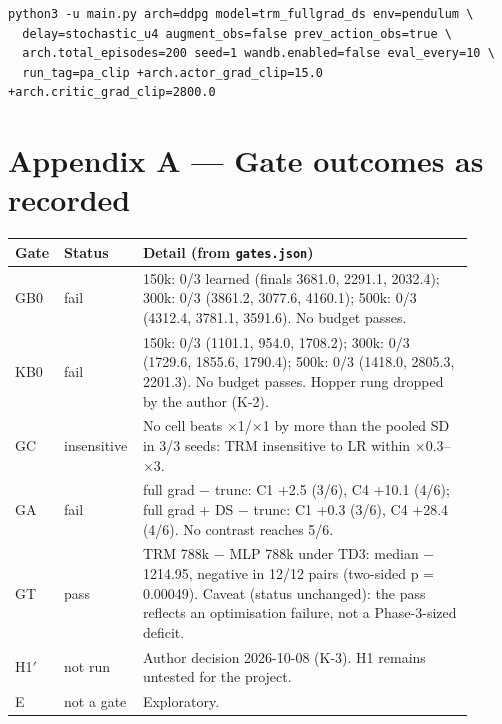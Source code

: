 \documentclass[11pt]{article}
\begin{document}
{\small\begin{verbatim}
python3 -u main.py arch=ddpg model=trm_fullgrad_ds env=pendulum \
  delay=stochastic_u4 augment_obs=false prev_action_obs=true \
  arch.total_episodes=200 seed=1 wandb.enabled=false eval_every=10 \
  run_tag=pa_clip +arch.actor_grad_clip=15.0 +arch.critic_grad_clip=2800.0
\end{verbatim}}



\section*{Appendix A --- Gate outcomes as recorded}



\begin{center}\small\begin{tabular}{>{\raggedright\arraybackslash}p{0.079\linewidth}>{\raggedright\arraybackslash}p{0.127\linewidth}>{\raggedright\arraybackslash}p{0.701\linewidth}}
\toprule
Gate & Status & Detail (from \texttt{gates.json}) \\
\midrule
GB0 & fail & 150k: 0/3 learned (finals 3681.0, 2291.1, 2032.4); 300k: 0/3 (3861.2, 3077.6, 4160.1); 500k: 0/3 (4312.4, 3781.1, 3591.6). No budget passes. \\
KB0 & fail & 150k: 0/3 (1101.1, 954.0, 1708.2); 300k: 0/3 (1729.6, 1855.6, 1790.4); 500k: 0/3 (1418.0, 2805.3, 2201.3). No budget passes. Hopper rung dropped by the author (K-2). \\
GC & insensitive & No cell beats $\times$1/$\times$1 by more than the pooled SD in 3/3 seeds: TRM insensitive to LR within $\times$0.3--$\times$3. \\
GA & fail & full grad $-$ trunc: C1 +2.5 (3/6), C4 +10.1 (4/6); full grad + DS $-$ trunc: C1 +0.3 (3/6), C4 +28.4 (4/6). No contrast reaches 5/6. \\
GT & pass & TRM 788k $-$ MLP 788k under TD3: median $-$1214.95, negative in 12/12 pairs (two-sided p = 0.00049). Caveat (status unchanged): the pass reflects an optimisation failure, not a Phase-3-sized deficit. \\
H1$'$ & not run & Author decision 2026-10-08 (K-3). H1 remains untested for the project. \\
E & not a gate & Exploratory. \\
\bottomrule
\end{tabular}\end{center}
\end{document}
